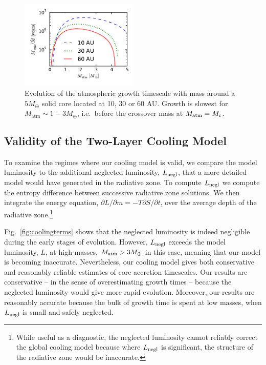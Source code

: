 \documentclass[apj, numberedappendix]{emulateapj}
\newcommand{\p}{\partial}
\newcommand{\Fig}[1]{Fig.~\ref{#1}}
\newcommand{\co}{_{\rm c}}
\begin{document}
\begin{figure}[tb]
\centering
\includegraphics[width=0.5\textwidth]{../../figs/ModelAtmospheres/RadSelfGravPoly/PaperFigs/Mt_profile_temp.pdf}
\caption{Evolution of the atmospheric growth timescale with mass around a $5 M_{\oplus}$ solid core  located at 10, 30 or 60 AU.  Growth is slowest for $M_{\mathrm{atm}} \sim 1 - 3 M_{\oplus}$, i.e.\ before the crossover mass at $M_{\rm atm} = M\co$.}
\label{fig:growthtime}
\end{figure}

\subsection{Validity of the Two-Layer Cooling Model}
\label{sec:endoftime}

To examine the regimes where our cooling model is valid, we compare the model luminosity to the additional neglected luminosity, $L_{\rm negl}$, that a more detailed model would have generated in the radiative zone.  To compute $L_{\rm negl}$ we compute the entropy difference between successive radiative zone solutions.  We then integrate the energy equation, $\p L / \p m = - T \p S/ \p t$, over the average depth of the radiative zone.\footnote{While useful as a diagnostic, the neglected luminosity cannot reliably correct the global cooling model because where $L_{\rm negl}$ is significant, the structure of the radiative zone would be inaccurate.}

 \Fig{fig:coolingterms} shows that the neglected luminosity is indeed negligible during the early stages of evolution.  However, $L_{\rm negl}$ exceeds the model luminosity, $L$, at high masses, $M_{\rm atm} > 3 M_\oplus$ in this case, meaning that our model is becoming inaccurate.  Nevertheless, our cooling model gives both conservative and reasonably reliable estimates of core accretion timescales.  Our results are conservative -- in the sense of overestimating growth times -- because the neglected luminosity would give more rapid evolution.  Moreover, our results are reasonably accurate because the bulk of growth time is spent at low masses, when $L_{\rm negl}$ is small and safely neglected.
 
\end{document}

